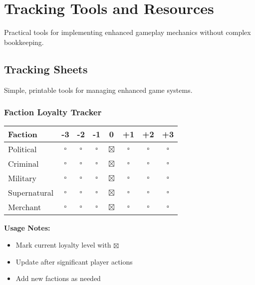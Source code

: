 \chapter{Tracking Tools and Resources}

Practical tools for implementing enhanced gameplay mechanics without complex bookkeeping.

\section{Tracking Sheets}

Simple, printable tools for managing enhanced game systems.

\subsection{Faction Loyalty Tracker}
\begin{center}
\begin{tabular}{|l|c|c|c|c|c|c|c|}
\hline
\textbf{Faction} & \textbf{-3} & \textbf{-2} & \textbf{-1} & \textbf{0} & \textbf{+1} & \textbf{+2} & \textbf{+3} \\
\hline
Political & $\square$ & $\square$ & $\square$ & $\boxtimes$ & $\square$ & $\square$ & $\square$ \\
Criminal & $\square$ & $\square$ & $\square$ & $\boxtimes$ & $\square$ & $\square$ & $\square$ \\
Military & $\square$ & $\square$ & $\square$ & $\boxtimes$ & $\square$ & $\square$ & $\square$ \\
Supernatural & $\square$ & $\square$ & $\square$ & $\boxtimes$ & $\square$ & $\square$ & $\square$ \\
Merchant & $\square$ & $\square$ & $\square$ & $\boxtimes$ & $\square$ & $\square$ & $\square$ \\
\hline
\end{tabular}
\end{center}

\textbf{Usage Notes:}
\begin{itemize}
\item Mark current loyalty level with $\boxtimes$
\item Update after significant player actions
\item Add new factions as needed
\end{itemize}

